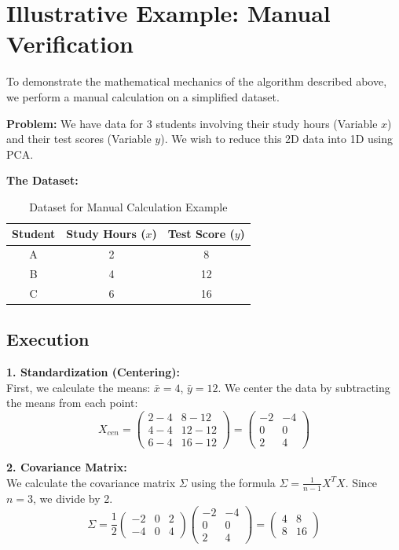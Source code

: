 \documentclass[12pt, a4paper]{report}
\begin{document}
\section{Illustrative Example: Manual Verification}
To demonstrate the mathematical mechanics of the algorithm described above, we perform a manual calculation on a simplified dataset.

\textbf{Problem:} We have data for 3 students involving their study hours (Variable $x$) and their test scores (Variable $y$). We wish to reduce this 2D data into 1D using PCA.

\textbf{The Dataset:}
\begin{table}[h]
    \centering
    \caption{Dataset for Manual Calculation Example}
    \label{tab:manual_example}
    \begin{tabular}{ccc}
        \toprule
        \textbf{Student} & \textbf{Study Hours ($x$)} & \textbf{Test Score ($y$)} \\
        \midrule
        A & 2 & 8 \\
        B & 4 & 12 \\
        C & 6 & 16 \\
        \bottomrule
    \end{tabular}
\end{table}

\subsection*{Execution}

\textbf{1. Standardization (Centering):} \\
First, we calculate the means: $\bar{x} = 4$, $\bar{y} = 12$. We center the data by subtracting the means from each point:
\[
X_{cen} = \begin{pmatrix} 2-4 & 8-12 \\ 4-4 & 12-12 \\ 6-4 & 16-12 \end{pmatrix} = \begin{pmatrix} -2 & -4 \\ 0 & 0 \\ 2 & 4 \end{pmatrix}
\]

\textbf{2. Covariance Matrix:} \\
We calculate the covariance matrix $\Sigma$ using the formula $\Sigma = \frac{1}{n-1}X^T X$. Since $n=3$, we divide by 2.
\[
\Sigma = \frac{1}{2} \begin{pmatrix} -2 & 0 & 2 \\ -4 & 0 & 4 \end{pmatrix} \begin{pmatrix} -2 & -4 \\ 0 & 0 \\ 2 & 4 \end{pmatrix} = \begin{pmatrix} 4 & 8 \\ 8 & 16 \end{pmatrix}
\]
\end{document}
